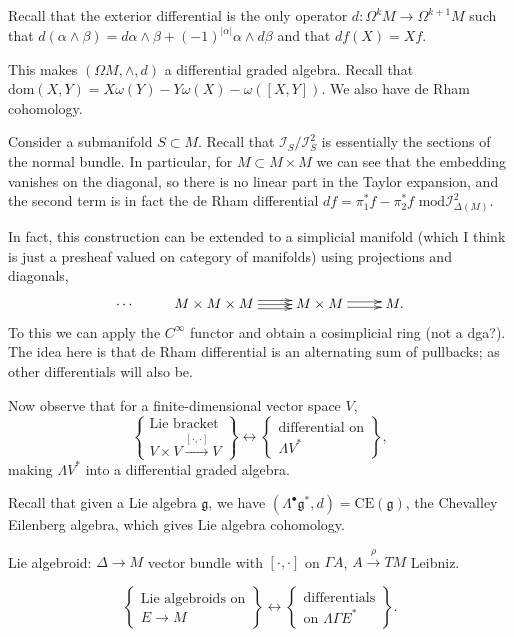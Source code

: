 Recall that the exterior differential is
the only operator $d:\Omega^kM \to
\Omega^{k+1}M$
such that $d(\alpha \wedge \beta)=d\alpha
\wedge \beta +
(-1)^{|\alpha|}\alpha \wedge d\beta$
and that $df(X)=Xf$.

This makes $(\Omega M,\wedge,d)$ a
differential graded algebra.
Recall that $\text{dom}(X,Y)=X\omega(Y)-Y
\omega(X)-\omega([X,Y])$.
We also have de Rham cohomology.

Consider a submanifold $S \subset M$. Recall
that $\mathcal{I}_S/\mathcal{I}^2_S$ is
essentially
the sections of the normal bundle.
In particular, for $M \subset M \times M$
we can see that the embedding vanishes on the
diagonal,
so there is no linear part in the Taylor
expansion,
and the second term is in fact the de Rham
differential
$df=\pi_1^*f-\pi_2^*f \text{ mod
}\mathcal{I}^2_{\Delta(M)}$.

In fact, this construction can be extended to
a simplicial manifold
(which I think is just a presheaf valued on
category of manifolds)
using projections and diagonals,
$$
\xymatrix{
\cdots & M\times M \times M
\ar @< 3pt> [r]
\ar @< 0pt> [r]
\ar @<-3pt> [r] & M \times M \ar @< 2pt> [r]
\ar @<-2pt> [r]& M.
}
$$
To this we can apply the $C^\infty$ functor
and obtain
a cosimplicial ring (not a dga?).
The idea here
is that de Rham differential is an
alternating sum of pullbacks;
as other differentials will also be.

\medskip\noindent
Now observe that for a finite-dimensional
vector space $V$,
$$
\left\{\substack{\text{Lie bracket} \\
V \times V
\xrightarrow{[\cdot,\cdot]}V}\right\}
\leftrightarrow
\left\{\substack{\text{differential on} \\
\Lambda V^*}\right\},
$$
making $\Lambda V^*$ into a differential
graded algebra.

Recall that given a Lie algebra
$\mathfrak{g}$,
we have $(\Lambda^\bullet \mathfrak{g}^*
,d)=\text{CE}(\mathfrak{g})$,
the Chevalley Eilenberg algebra,
which gives Lie algebra cohomology.

\medskip{}

\medskip\noindent
Lie algebroid: $\Delta \to M$ vector bundle
with $[\cdot,\cdot]$ on $\Gamma A$,
$A \xrightarrow{\rho}TM$ Leibniz.

\begin{remark}
\label{remark-lie-algebroids-differentials}
$$
\left\{\substack{\text{Lie algebroids on} \\
E \to M}\right\}
\leftrightarrow
\left\{\substack{\text{differentials} \\
\text{on }\Lambda\Gamma E^*}\right\}.
$$
\end{remark}

